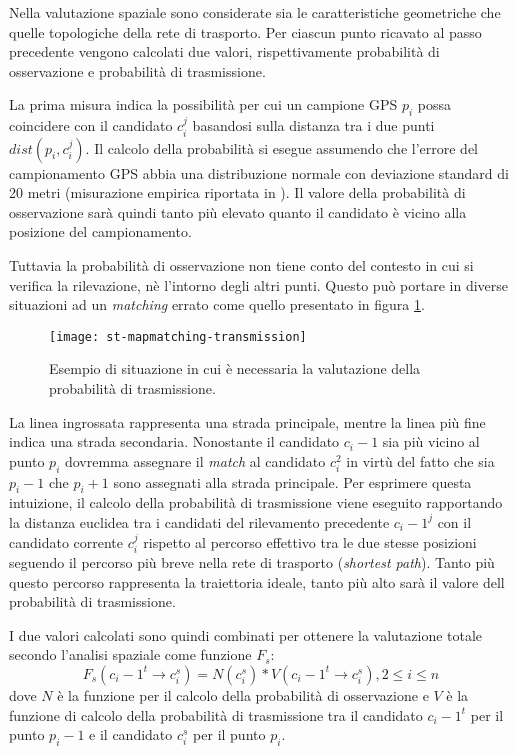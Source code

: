 Nella valutazione spaziale sono considerate sia le caratteristiche geometriche che quelle topologiche della rete di trasporto. Per ciascun punto ricavato al passo precedente vengono calcolati due valori, rispettivamente probabilità di osservazione e probabilità di trasmissione.

La prima misura indica la possibilità per cui un campione GPS $p_i$ possa coincidere con il candidato $c_i^j$ basandosi sulla distanza tra i due punti $dist(p_i, c_i^j)$. Il calcolo della probabilità si esegue assumendo che l'errore del campionamento GPS abbia una distribuzione normale con deviazione standard di 20 metri (misurazione empirica riportata in \cite[paragrafo 5.2]{stmapmatching}). Il valore della probabilità di osservazione sarà quindi tanto più elevato quanto il candidato è vicino alla posizione del campionamento. 

Tuttavia la probabilità di osservazione non tiene conto del contesto in cui si verifica la rilevazione, nè l'intorno degli altri punti. Questo può portare in diverse situazioni ad un \emph{matching} errato come quello presentato in figura \ref{fig:st-mapmatching-transmission}.

\begin{figure}[h]
  \centering
  \texttt{[image: st-mapmatching-transmission]}
  \caption{\footnotesize{Esempio di situazione in cui è necessaria la valutazione della probabilità di trasmissione.}}
  \label{fig:st-mapmatching-transmission}
\end{figure}
La linea ingrossata rappresenta una strada principale, mentre la linea più fine indica una strada secondaria. Nonostante il candidato $c_i-1$ sia più vicino al punto $p_i$ dovremma assegnare il \emph{match} al candidato $c_i^2$ in virtù del fatto che sia $p_i-1$ che $p_i+1$ sono assegnati alla strada principale. Per esprimere questa intuizione, il calcolo della probabilità di trasmissione viene eseguito rapportando la distanza euclidea tra i candidati del rilevamento precedente $c_i-1^j$ con il candidato corrente $c_i^j$ rispetto al percorso effettivo tra le due stesse posizioni seguendo il percorso più breve nella rete di trasporto (\emph{shortest path}). Tanto più questo percorso rappresenta la traiettoria ideale, tanto più alto sarà il valore dell probabilità di trasmissione.

I due valori calcolati sono quindi combinati per ottenere la valutazione totale secondo l'analisi spaziale come funzione $F_s$:
$$ F_s(c_i-1^t \rightarrow c_i^s) = N(c_i^s) * V(c_i-1^t \rightarrow c_i^s), 2 \leq i \leq n $$
dove $N$ è la funzione per il calcolo della probabilità di osservazione e $V$ è la funzione di calcolo della probabilità di trasmissione tra il candidato $c_i-1^t$ per il punto $p_i-1$ e il candidato $c_i^s$ per il punto $p_i$.

